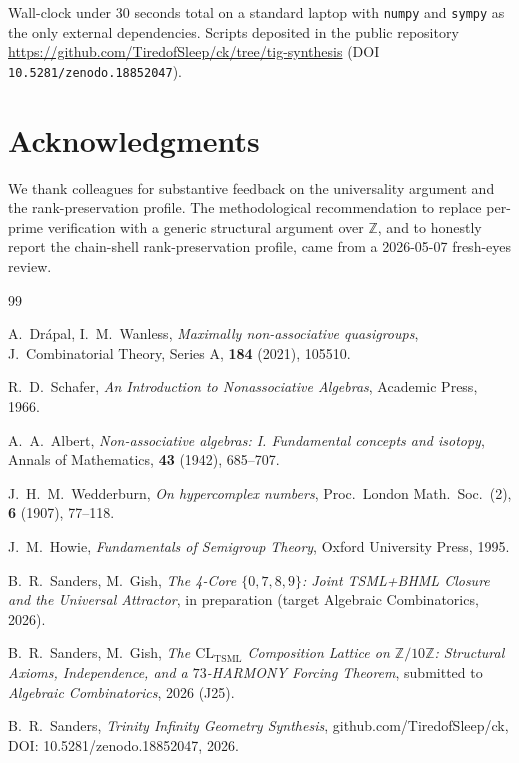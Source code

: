 \documentclass[11pt,reqno]{amsart}
\theoremstyle{plain}
\theoremstyle{definition}
\theoremstyle{remark}
\newcommand{\Z}{\mathbb{Z}}
\newcommand{\TSML}{\mathrm{TSML}}
\begin{document}
Wall-clock under $30$ seconds total on a standard laptop with
\texttt{numpy} and \texttt{sympy} as the only external dependencies.
Scripts deposited in the public repository
\url{https://github.com/TiredofSleep/ck/tree/tig-synthesis}
(DOI \texttt{10.5281/zenodo.18852047}).

\section*{Acknowledgments}
We thank colleagues for substantive feedback on the universality
argument and the rank-preservation profile. The methodological
recommendation to replace per-prime verification with a generic
structural argument over $\Z$, and to honestly report the
chain-shell rank-preservation profile, came from a 2026-05-07
fresh-eyes review.

\begin{thebibliography}{99}

A.~Drápal, I.~M.~Wanless,
\emph{Maximally non-associative quasigroups},
J.~Combinatorial Theory, Series A, \textbf{184} (2021), 105510.

R.~D.~Schafer,
\emph{An Introduction to Nonassociative Algebras},
Academic Press, 1966.

A.~A.~Albert,
\emph{Non-associative algebras: I. Fundamental concepts and isotopy},
Annals of Mathematics, \textbf{43} (1942), 685--707.

J.~H.~M.~Wedderburn,
\emph{On hypercomplex numbers},
Proc.~London Math.~Soc.~(2), \textbf{6} (1907), 77--118.

J.~M.~Howie,
\emph{Fundamentals of Semigroup Theory},
Oxford University Press, 1995.

B.~R.~Sanders, M.~Gish,
\emph{The 4-Core $\{0, 7, 8, 9\}$: Joint TSML+BHML Closure and the
Universal Attractor},
in preparation (target Algebraic Combinatorics, 2026).

B.~R.~Sanders, M.~Gish,
\emph{The $\mathrm{CL}_{\TSML}$ Composition Lattice on $\Z/10\Z$:
Structural Axioms, Independence, and a $73$-HARMONY Forcing
Theorem},
submitted to \emph{Algebraic Combinatorics}, 2026 (J25).

B.~R.~Sanders,
\emph{Trinity Infinity Geometry Synthesis},
github.com/TiredofSleep/ck, DOI: 10.5281/zenodo.18852047, 2026.

\end{thebibliography}
\end{document}
